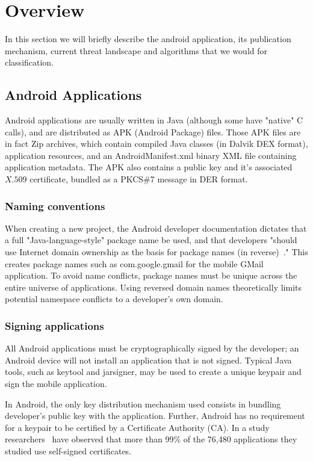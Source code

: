 \chapter{Overview}
\thispagestyle{plain}
\label{Overview}

In this section we will briefly describe the android application, its publication mechanism, current threat landscape and algorithms that we would for classification.
\section{Android Applications}
\label{Android Applications}

Android applications are usually written in Java (although some have "native" C calls), and are distributed as APK (Android Package) files. Those APK files are in fact Zip archives, which contain compiled Java classes (in Dalvik DEX format), application resources, and an AndroidManifest.xml binary XML file containing application metadata. The APK also contains a public key and it’s associated $X.509$ certificate, bundled as a PKCS\#7 message in DER format.

\subsection{Naming conventions}
\label{Naming conventions}
When creating a new project, the Android developer documentation dictates that a full "Java-language-style" package name be used, and that developers "should use Internet domain ownership as the basis for package names (in reverse)~\cite{16}." This creates package names such as com.google.gmail for the mobile GMail application. To avoid name conflicts, package names must be unique across the entire universe of applications. Using reversed domain names theoretically limits potential namespace conflicts to a developer's own domain.

\subsection{Signing applications}
\label{Signing applications}
All Android applications must be cryptographically signed by the developer; an Android device will not install an application that is not signed. Typical Java tools, such as keytool and jarsigner, may be used to create a unique keypair and sign the mobile application.

In Android, the only key distribution mechanism used consists in bundling developer's public key with the application. Further, Android has no requirement for a keypair to be certified by a Certificate Authority (CA). In a study researchers~\cite{56} have observed that more than 99\% of the 76,480 applications they studied use self-signed certificates.


